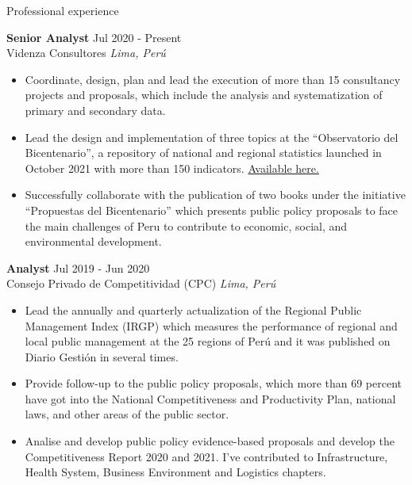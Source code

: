 \documentclass{resume} %
\begin{document}
\begin{rSection}{Professional experience}

\textbf{Senior Analyst} \hfill Jul 2020 - Present \\
Videnza Consultores \hfill \textit{Lima, Perú}
 \begin{itemize}
    \itemsep -3pt {} 
      \item Coordinate, design, plan and lead the execution of more than 15 consultancy projects and proposals, which include the analysis and systematization of primary and secondary data.
      \item Lead the design and implementation of three topics at the “Observatorio del Bicentenario”, a repository of national and regional statistics launched in October 2021 with more than 150 indicators. \href{https://propuestasdelbicentenario.pe/observatorio/}{Available here.}
      \item Successfully collaborate with the publication of two books under the initiative “Propuestas del Bicentenario” which presents public policy proposals to face the main challenges of Peru to contribute to economic, social, and environmental development. 
 \end{itemize}
 
 \textbf{Analyst} \hfill Jul 2019 - Jun 2020\\
Consejo Privado de Competitividad (CPC) \hfill \textit{Lima, Perú}
 \begin{itemize}
    \itemsep -3pt {} 
      \item Lead the annually and quarterly actualization of the Regional Public Management Index (IRGP) which measures the performance of regional and local public management at the 25 regions of Perú and it was published on Diario Gestión in several times. 
      \item Provide follow-up to the public policy proposals, which more than 69 percent have got into the National Competitiveness and Productivity Plan, national laws, and other areas of the public sector.
      \item Analise and develop public policy evidence-based proposals and develop the Competitiveness Report 2020 and 2021. I’ve contributed to Infrastructure, Health System, Business Environment and Logistics chapters. 
 \end{itemize}


\end{rSection}
\end{document}
